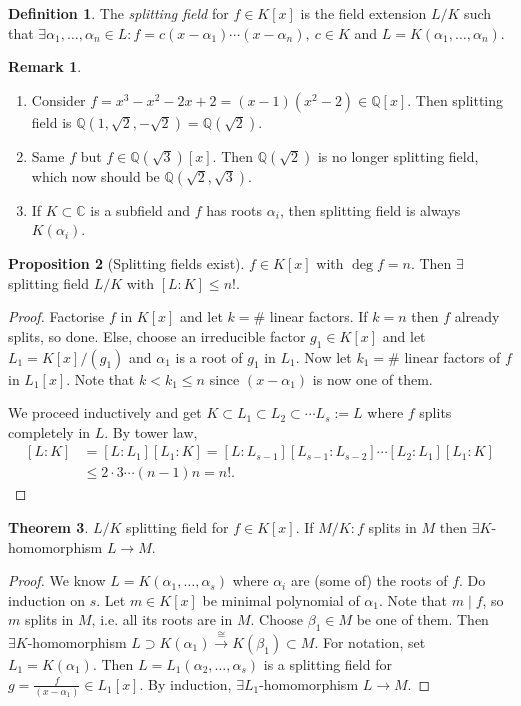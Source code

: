 \documentclass[a4paper]{article}
\newcommand{\Q}{\mathbb Q}
\newcommand{\C}{\mathbb C}
\theoremstyle{definition}
\newtheorem{defn}{Definition}[subsection]
\newtheorem{prop}[defn]{Proposition}
\newtheorem{thm}[defn]{Theorem}
\newtheorem*{remark}{Remark}
\begin{document}
\begin{defn}
The \textit{splitting field} for $f\in K[x]$ is the field extension $L/K$ such that $\exists \alpha_1,\ldots,\alpha_n\in L:f=c(x-\alpha_1)\cdots (x-\alpha_n),\ c\in K$ and $L=K(\alpha_1,\ldots,\alpha_n)$.
\end{defn}

\begin{remark}
\begin{enumerate}
\item Consider $f=x^3-x^2-2x+2=(x-1)(x^2-2)\in\Q[x]$. Then splitting field is $\Q\left(1,\sqrt2,-\sqrt2\right)=\Q\left(\sqrt 2\right)$.
\item Same $f$ but $f\in \Q\left(\sqrt 3\right)[x]$. Then $\Q(\sqrt 2)$ is no longer splitting field, which now should be $\Q\left(\sqrt2,\sqrt3\right)$.
\item If $K\subset \C$ is a subfield and $f$ has roots $\alpha_i$, then splitting field is always $K(\alpha_i)$.
\end{enumerate}
\end{remark}

\begin{prop}[Splitting fields exist]
$f\in K[x]$ with $\deg f=n$. Then $\exists$ splitting field $L/K$ with $[L:K]\leq n!$.
\end{prop}
\begin{proof}
Factorise $f$ in $K[x]$ and let $k=\#$ linear factors. If $k=n$ then $f$ already splits, so done. Else, choose an irreducible factor $g_1\in K[x]$ and let $L_1=K[x]/(g_1)$ and $\alpha_1$ is a root of $g_1$ in $L_1$. Now let $k_1=\#$ linear factors of $f$ in $L_1[x]$. Note that $k<k_1\leq n$ since $(x-\alpha_1)$ is now one of them.

We proceed inductively and get $K\subset L_1\subset L_2\subset \cdots L_s:=L$ where $f$ splits completely in $L$. By tower law,
\[
\begin{aligned}
[L:K]&=[L:L_1][L_1:K]=[L:L_{s-1}] [L_{s-1}:L_{s-2}] \cdots [L_2:L_1][L_1:K]\\
&\leq 2\cdot 3\cdots (n-1)n=n!.
\end{aligned}
\]
\end{proof}

\begin{thm}
$L/K$ splitting field for $f\in K[x]$. If $M/K:f$ splits in $M$ then $\exists K$-homomorphism $L\rightarrow M$.
\end{thm}
\begin{proof}
We know $L=K(\alpha_1,\ldots,\alpha_s)$ where $\alpha_i$ are (some of) the roots of $f$. Do induction on $s$. Let $m\in K[x]$ be minimal polynomial of $\alpha_1$. Note that $m\mid f$, so $m$ splits in $M$, i.e. all its roots are in $M$. Choose $\beta_1\in M$ be one of them. Then $\exists K$-homomorphism $L\supset K(\alpha_1)\xrightarrow{\cong} K(\beta_1)\subset M$. For notation, set $L_1=K(\alpha_1)$. Then $L=L_1(\alpha_2,\ldots,\alpha_s)$ is a splitting field for $g=\frac{f}{(x-\alpha_1)} \in L_1[x]$. By induction, $\exists L_1$-homomorphism $L\rightarrow M$.
\end{proof}
\end{document}
